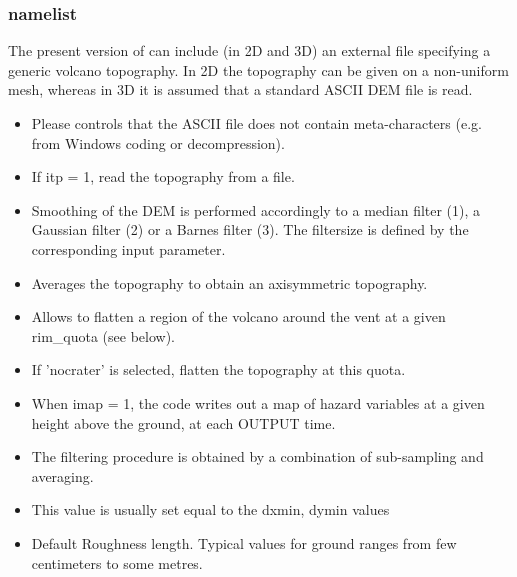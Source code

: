 \subsubsection{ namelist}
The present version of \PDAC can include (in 2D and 3D) an external file specifying a generic volcano topography. In 2D the topography can be given on a non-uniform mesh, whereas in 3D it is assumed that a standard ASCII DEM file is read.

\begin{itemize}
\item
{}
{Please controls that the ASCII file does not contain meta-characters (e.g. from Windows coding or decompression).}

\item
{}
{If itp = 1, read the topography from a file.}

\item
{}
{Smoothing of the DEM is performed accordingly to a median filter (1), a 
Gaussian filter (2) or a Barnes filter (3). The filtersize is defined
by the corresponding input parameter.}

\item
{}
{Averages the topography to obtain an axisymmetric topography.}

\item
{}
{Allows to flatten a region of the volcano around the vent at a given rim\_quota (see below).}

\item
{}
{If 'nocrater' is selected, flatten the topography at this quota.}

\item
{}
{When imap = 1, the code writes out a map of hazard variables at a given height
above the ground, at each OUTPUT time.}

\item
{}
{The filtering procedure is obtained by a combination of sub-sampling and averaging.}

\item
{}
{This value is usually set equal to the dxmin, dymin values}

\item
{}
{Default Roughness length. Typical values for ground
ranges from few centimeters to some metres.}

\end{itemize}

